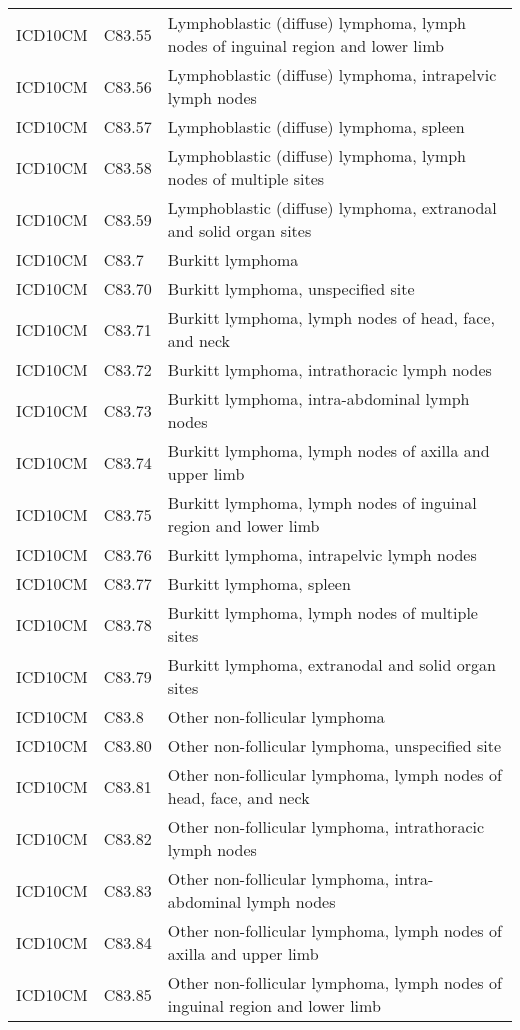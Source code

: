 \begin{longtable}{p{}p{}p{}}
  ICD10CM & C83.55 & Lymphoblastic (diffuse) lymphoma, lymph nodes of inguinal region and lower limb \\ 
  ICD10CM & C83.56 & Lymphoblastic (diffuse) lymphoma, intrapelvic lymph nodes \\ 
  ICD10CM & C83.57 & Lymphoblastic (diffuse) lymphoma, spleen \\ 
  ICD10CM & C83.58 & Lymphoblastic (diffuse) lymphoma, lymph nodes of multiple sites \\ 
  ICD10CM & C83.59 & Lymphoblastic (diffuse) lymphoma, extranodal and solid organ sites \\ 
  ICD10CM & C83.7 & Burkitt lymphoma \\ 
  ICD10CM & C83.70 & Burkitt lymphoma, unspecified site \\ 
  ICD10CM & C83.71 & Burkitt lymphoma, lymph nodes of head, face, and neck \\ 
  ICD10CM & C83.72 & Burkitt lymphoma, intrathoracic lymph nodes \\ 
  ICD10CM & C83.73 & Burkitt lymphoma, intra-abdominal lymph nodes \\ 
  ICD10CM & C83.74 & Burkitt lymphoma, lymph nodes of axilla and upper limb \\ 
  ICD10CM & C83.75 & Burkitt lymphoma, lymph nodes of inguinal region and lower limb \\ 
  ICD10CM & C83.76 & Burkitt lymphoma, intrapelvic lymph nodes \\ 
  ICD10CM & C83.77 & Burkitt lymphoma, spleen \\ 
  ICD10CM & C83.78 & Burkitt lymphoma, lymph nodes of multiple sites \\ 
  ICD10CM & C83.79 & Burkitt lymphoma, extranodal and solid organ sites \\ 
  ICD10CM & C83.8 & Other non-follicular lymphoma \\ 
  ICD10CM & C83.80 & Other non-follicular lymphoma, unspecified site \\ 
  ICD10CM & C83.81 & Other non-follicular lymphoma, lymph nodes of head, face, and neck \\ 
  ICD10CM & C83.82 & Other non-follicular lymphoma, intrathoracic lymph nodes \\ 
  ICD10CM & C83.83 & Other non-follicular lymphoma, intra-abdominal lymph nodes \\ 
  ICD10CM & C83.84 & Other non-follicular lymphoma, lymph nodes of axilla and upper limb \\ 
  ICD10CM & C83.85 & Other non-follicular lymphoma, lymph nodes of inguinal region and lower limb \\ 

\end{longtable}
